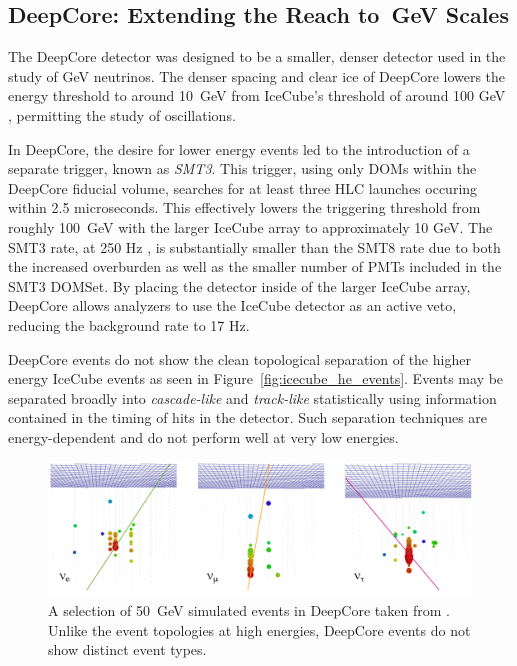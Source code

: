 \subsection{DeepCore: Extending the Reach to~GeV Scales}
\label{subsec:deepcore}
The DeepCore detector was designed to be a smaller, denser detector used in the study of GeV neutrinos.
The denser spacing and clear ice of DeepCore lowers the energy threshold to around 10~GeV from IceCube's threshold of around 100 GeV \cite{Description-DeepCore}, permitting the study of oscillations.


In DeepCore, the desire for lower energy events led to the introduction of a separate trigger, known as \emph{SMT3}.
This trigger, using only DOMs within the DeepCore fiducial volume, searches for at least three HLC launches occuring within 2.5 microseconds.
This effectively lowers the triggering threshold from roughly 100~GeV with the larger IceCube array to approximately 10 GeV.
The SMT3 rate, at 250 Hz \cite{Description-IceCube, Description-DeepCore}, is substantially smaller than the SMT8 rate due to both the increased overburden as well as the smaller number of PMTs included in the SMT3 DOMSet.
By placing the detector inside of the larger IceCube array, DeepCore allows analyzers to use the IceCube detector as an active veto, reducing the background rate to 17 Hz.

DeepCore events do not show the clean topological separation of the higher energy IceCube events as seen in Figure~\ref{fig:icecube_he_events}.
Events may be separated broadly into \emph{cascade-like} and \emph{track-like} statistically using information contained in the timing of hits in the detector.
Such separation techniques are energy-dependent and do not perform well at very low energies.

\begin{figure}
\centering
\includegraphics[width=0.9\linewidth]{deepcore_le_views.png} 
\caption[Event topologies of 50~GeV events in DeepCore]{A selection of 50~GeV simulated events in DeepCore taken from \cite{Thesis-Euler}. Unlike the event topologies at high energies, DeepCore events do not show distinct event types.}
\label{fig:deepcore_events}
\end{figure}

